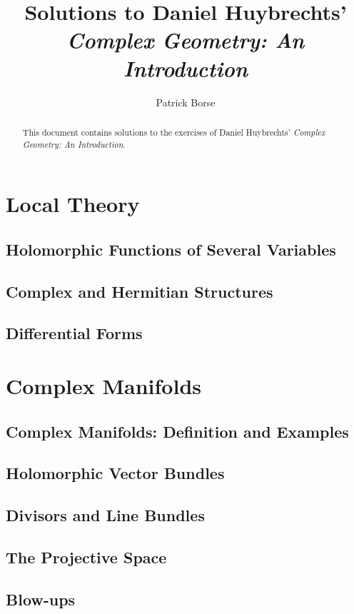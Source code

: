 \documentclass[oneside]{amsbook}
\title{Solutions to Daniel Huybrechts'\\ \emph{Complex Geometry: An Introduction}}
\author{Patrick Borse}
\numberwithin{ex}{section}
\begin{document}
\begin{abstract}
This document contains solutions to the exercises of Daniel Huybrechts' \emph{Complex Geometry: An Introduction}.
\end{abstract}

\maketitle

\tableofcontents

\chapter{Local Theory}
\section{Holomorphic Functions of Several Variables}

\section{Complex and Hermitian Structures}

\section{Differential Forms}


\chapter{Complex Manifolds}
\section{Complex Manifolds: Definition and Examples}

\section{Holomorphic Vector Bundles}

\section{Divisors and Line Bundles}

\section{The Projective Space}

\section{Blow-ups}

\end{document}
